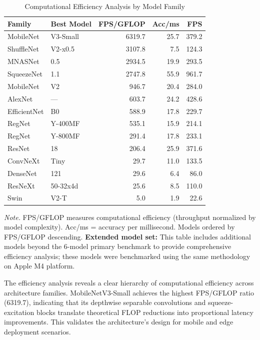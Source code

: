 \documentclass[10pt,twocolumn,a4paper]{article}
\theoremstyle{definition}
\theoremstyle{plain}
\begin{document}
\begin{table}[t]
\centering
\caption{Computational Efficiency Analysis by Model Family}
\label{tab:efficiency}
\footnotesize
\setlength{\tabcolsep}{4pt}
\begin{tabular}{@{}llrrr@{}}
\toprule
\textbf{Family} & \textbf{Best Model} & \textbf{FPS/GFLOP} & \textbf{Acc/ms} & \textbf{FPS} \\
\midrule
MobileNet & V3-Small & 6319.7 & 25.7 & 379.2 \\
ShuffleNet & V2-x0.5 & 3107.8 & 7.5 & 124.3 \\
MNASNet & 0.5 & 2934.5 & 19.9 & 293.5 \\
SqueezeNet & 1.1 & 2747.8 & 55.9 & 961.7 \\
MobileNet & V2 & 946.7 & 20.4 & 284.0 \\
AlexNet & --- & 603.7 & 24.2 & 428.6 \\
EfficientNet & B0 & 588.9 & 17.8 & 229.7 \\
RegNet & Y-400MF & 535.1 & 15.9 & 214.1 \\
RegNet & Y-800MF & 291.4 & 17.8 & 233.1 \\
ResNet & 18 & 206.4 & 25.9 & 371.6 \\
ConvNeXt & Tiny & 29.7 & 11.0 & 133.5 \\
DenseNet & 121 & 29.6 & 6.4 & 86.0 \\
ResNeXt & 50-32x4d & 25.6 & 8.5 & 110.0 \\
Swin & V2-T & 5.0 & 1.9 & 22.6 \\
\bottomrule
\end{tabular}

\vspace{0.5em}
\noindent\textit{Note.} FPS/GFLOP measures computational efficiency (throughput normalized by model complexity). Acc/ms = accuracy per millisecond. Models ordered by FPS/GFLOP descending. \textbf{Extended model set:} This table includes additional models beyond the 6-model primary benchmark to provide comprehensive efficiency analysis; these models were benchmarked using the same methodology on Apple M4 platform.
\end{table}

The efficiency analysis reveals a clear hierarchy of computational efficiency across architecture families. MobileNetV3-Small achieves the highest FPS/GFLOP ratio (6319.7), indicating that its depthwise separable convolutions and squeeze-excitation blocks translate theoretical FLOP reductions into proportional latency improvements. This validates the architecture's design for mobile and edge deployment scenarios.
\end{document}
